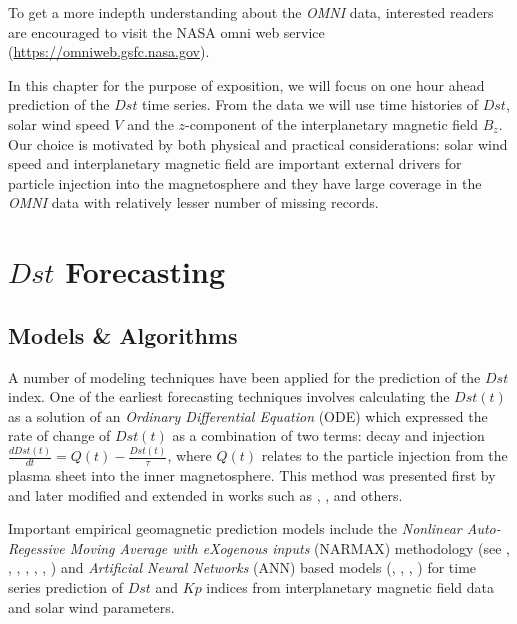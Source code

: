 \documentclass{article}
\begin{document}
To get a more indepth understanding about the \emph{OMNI} data, interested readers are encouraged to visit the NASA omni web service (\url{https://omniweb.gsfc.nasa.gov}).

In this chapter for the purpose of exposition, we will focus on one hour ahead prediction of the $Dst$ time series. From the data we will use time histories of $Dst$, solar wind speed $V$ and the $z$-component of the interplanetary magnetic field $B_z$. Our choice is motivated by both physical and practical considerations: solar wind speed and interplanetary magnetic field are important external drivers for particle injection into the magnetosphere and they have large coverage in the \emph{OMNI} data with relatively lesser number of missing records.

\section{$Dst$ Forecasting}

\subsection{Models \& Algorithms}

A number of modeling techniques have been applied for the prediction of the $Dst$ index. One of the earliest forecasting techniques involves calculating the $Dst(t)$ as a solution of an \emph{Ordinary Differential Equation} (ODE) which expressed the rate of change of $Dst(t)$ as a combination of two terms: decay and injection $\frac{d Dst(t)}{dt} = Q(t) - \frac{Dst(t)}{\tau}$, where $Q(t)$ relates to the particle injection from the plasma sheet into the inner magnetosphere. This method was presented first by \citet{JGR:JGR10260} and later modified and extended in works such as \citet{Wang:Dst}, \citet{JGRA:JGRA14856}, \citet{Ballatore2014} and others.

Important empirical geomagnetic prediction models include the \emph{Nonlinear Auto-Regessive Moving Average with eXogenous inputs} (NARMAX) methodology (see \citet{doi:10.1080/00207178908559767}, \citet{GRL:GRL13494}, \citet{GRL:GRL20944}, \citet{JGRA:JGRA18657}, \citet{balikhin:narmax}, \citet{JGRA:JGRA20661}, \citet{JGRA:JGRA50192}) and \emph{Artificial Neural Networks} (ANN) based models (\citet{Lund}, \citet{JGRA:JGRA17461}, \citet{SWE:SWE286}, \citet{pallocchia:hal-00318011}) for time series prediction of $Dst$ and $Kp$ indices from interplanetary magnetic field data and solar wind parameters. 
\end{document}
